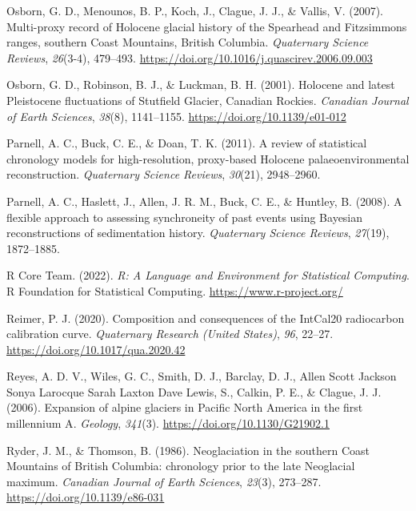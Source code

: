 \documentclass[
  letterpaper,
  DIV=11,
  numbers=noendperiod]{scrartcl}
\newlength{\cslhangindent}
\newlength{\cslentryspacingunit} %
\newenvironment{CSLReferences}[2] %
 {%
  \setlength{\parindent}{0pt}
  \ifodd #1
  \let\oldpar\par
  \def\par{\hangindent=\cslhangindent\oldpar}
  \fi
  \setlength{\parskip}{#2\cslentryspacingunit}
 }%
 {}
\begin{document}
\begin{CSLReferences}{1}{0}
\leavevmode{}%
Osborn, G. D., Menounos, B. P., Koch, J., Clague, J. J., \& Vallis, V.
(2007). {Multi-proxy record of Holocene glacial history of the Spearhead
and Fitzsimmons ranges, southern Coast Mountains, British Columbia}.
\emph{Quaternary Science Reviews}, \emph{26}(3-4), 479--493.
\url{https://doi.org/10.1016/j.quascirev.2006.09.003}

\leavevmode{}%
Osborn, G. D., Robinson, B. J., \& Luckman, B. H. (2001). {Holocene and
latest Pleistocene fluctuations of Stutfield Glacier, Canadian Rockies}.
\emph{Canadian Journal of Earth Sciences}, \emph{38}(8), 1141--1155.
\url{https://doi.org/10.1139/e01-012}

\leavevmode{}%
Parnell, A. C., Buck, C. E., \& Doan, T. K. (2011). {A review of
statistical chronology models for high-resolution, proxy-based Holocene
palaeoenvironmental reconstruction}. \emph{Quaternary Science Reviews},
\emph{30}(21), 2948--2960.

\leavevmode{}%
Parnell, A. C., Haslett, J., Allen, J. R. M., Buck, C. E., \& Huntley,
B. (2008). {A flexible approach to assessing synchroneity of past events
using Bayesian reconstructions of sedimentation history}.
\emph{Quaternary Science Reviews}, \emph{27}(19), 1872--1885.

\leavevmode{}%
R Core Team. (2022). \emph{{R: A Language and Environment for
Statistical Computing}}. R Foundation for Statistical Computing.
\url{https://www.r-project.org/}

\leavevmode{}%
Reimer, P. J. (2020). {Composition and consequences of the IntCal20
radiocarbon calibration curve}. \emph{Quaternary Research (United
States)}, \emph{96}, 22--27. \url{https://doi.org/10.1017/qua.2020.42}

\leavevmode{}%
Reyes, A. D. V., Wiles, G. C., Smith, D. J., Barclay, D. J., Allen Scott
Jackson Sonya Larocque Sarah Laxton Dave Lewis, S., Calkin, P. E., \&
Clague, J. J. (2006). {Expansion of alpine glaciers in Pacific North
America in the first millennium A}. \emph{Geology}, \emph{341}(3).
\url{https://doi.org/10.1130/G21902.1}

\leavevmode{}%
Ryder, J. M., \& Thomson, B. (1986). {Neoglaciation in the southern
Coast Mountains of British Columbia: chronology prior to the late
Neoglacial maximum}. \emph{Canadian Journal of Earth Sciences},
\emph{23}(3), 273--287. \url{https://doi.org/10.1139/e86-031}


\end{CSLReferences}
\end{document}
